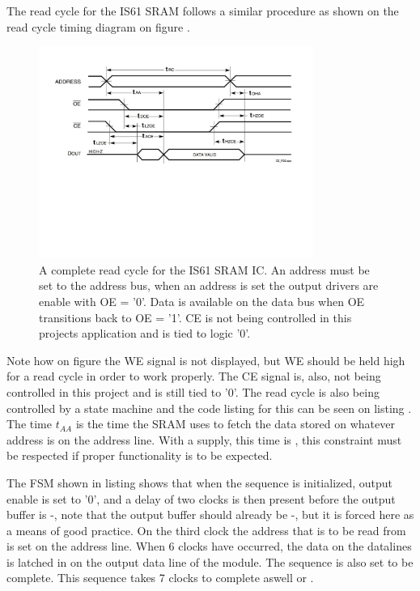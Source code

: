 The read cycle for the IS61 SRAM follows a similar procedure as shown on the read cycle timing diagram on figure .
\begin{figure}[H]
    \centering
    \includegraphics[clip, trim=0 250 0 0, width=0.8\textwidth]{Sections/7_SystemDesign/Figures/7_2_5_IS61_ReadCycle.pdf}
    \caption{A complete read cycle for the IS61 SRAM IC\cite{ISSISRAM}. An address must be set to the address bus, when an address is set the output drivers are enable with OE = '0'. Data is available on the data bus when OE transitions back to OE = '1'. CE is not being controlled in this projects application and is tied to logic '0'.}
    \label{fig:7_2_5_IS61_READ}
\end{figure}

Note how on figure  the WE signal is not displayed, but WE should be held high for a read cycle in order to work properly. The CE signal is, also, not being controlled in this project and is still tied to '0'. The read cycle is also being controlled by a state machine and the code listing for this can be seen on listing . The time $t_{AA}$ is the time the SRAM uses to fetch the data stored on whatever address is on the address line. With a  supply, this time is , this constraint must be respected if proper functionality is to be expected.


 

The FSM shown in listing   shows that when the sequence is initialized, output enable is set to '0', and a delay of two clocks is then present before the output buffer is -, note that the output buffer should already be -, but it is forced here as a means of good practice. On the third clock the address that is to be read from is set on the address line. When 6 clocks have occurred, the data on the datalines is latched in on the output data line of the module. The sequence is also set to be complete. This sequence takes 7 clocks to complete aswell or . 

